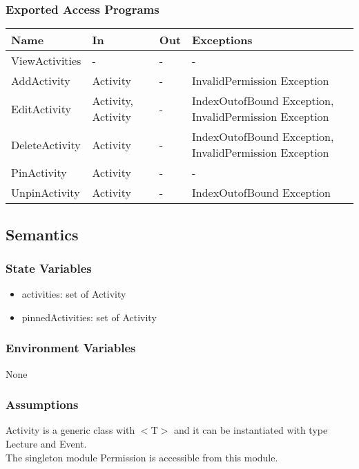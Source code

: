 \documentclass[12pt, titlepage]{article}
\begin{document}
\subsubsection{Exported Access Programs}
\begin{center}
\begin{tabular}{p{4cm} p{2cm} p{4cm} p{4cm}}
\hline
\textbf{Name} & \textbf{In} & \textbf{Out} & \textbf{Exceptions} \\
\hline
ViewActivities & - & - & - \\
AddActivity & Activity & - & InvalidPermission Exception \\
EditActivity & Activity, Activity & - & IndexOutofBound Exception, InvalidPermission Exception \\
DeleteActivity & Activity & - & IndexOutofBound Exception, InvalidPermission Exception \\
PinActivity & Activity & - & - \\
UnpinActivity & Activity & - & IndexOutofBound Exception \\
\hline
\end{tabular}
\end{center}

\subsection{Semantics}

\subsubsection{State Variables}

\begin{itemize}
  \item activities: set of Activity
  \item pinnedActivities: set of Activity
\end{itemize}

\subsubsection{Environment Variables}

None

\subsubsection{Assumptions}

Activity is a generic class with $<$T$>$ and it can be instantiated with type Lecture and Event.\\
The singleton module Permission is accessible from this module.
\end{document}
